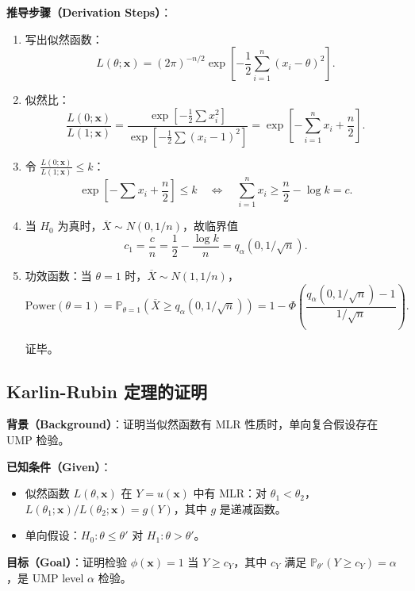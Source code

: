\textbf{推导步骤（Derivation Steps）}：

\begin{enumerate}
\item 写出似然函数：
\[
L(\theta; \mathbf{x}) = (2\pi)^{-n/2} \exp\left[-\frac{1}{2}\sum_{i=1}^n (x_i - \theta)^2\right].
\]

\item 似然比：
\[
\frac{L(0; \mathbf{x})}{L(1; \mathbf{x})} = \frac{\exp\left[-\frac{1}{2}\sum x_i^2\right]}{\exp\left[-\frac{1}{2}\sum (x_i-1)^2\right]} = \exp\left[-\sum_{i=1}^n x_i + \frac{n}{2}\right].
\]

\item 令 $\frac{L(0; \mathbf{x})}{L(1; \mathbf{x})} \leq k$：
\[
\exp\left[-\sum x_i + \frac{n}{2}\right] \leq k \quad \Longleftrightarrow \quad \sum_{i=1}^n x_i \geq \frac{n}{2} - \log k = c.
\]

\item 当 $H_0$ 为真时，$\overline{X} \sim N(0, 1/n)$，故临界值
\[
c_1 = \frac{c}{n} = \frac{1}{2} - \frac{\log k}{n} = q_{\alpha}(0, 1/\sqrt{n}).
\]

\item 功效函数：当 $\theta = 1$ 时，$\overline{X} \sim N(1, 1/n)$，
\[
\text{Power}(\theta=1) = \mathbb{P}_{\theta=1}\left(\overline{X} \geq q_{\alpha}(0, 1/\sqrt{n})\right) = 1 - \Phi\left(\frac{q_{\alpha}(0, 1/\sqrt{n}) - 1}{1/\sqrt{n}}\right).
\]

证毕。
\end{enumerate}

\subsection{Karlin-Rubin 定理的证明}\label{sec:karlin-rubin-proof}

\textbf{背景（Background）}：证明当似然函数有 MLR 性质时，单向复合假设存在 UMP 检验。

\textbf{已知条件（Given）}：
\begin{itemize}
\item 似然函数 $L(\theta, \mathbf{x})$ 在 $Y = u(\mathbf{x})$ 中有 MLR：对 $\theta_1 < \theta_2$，$L(\theta_1;\mathbf{x})/L(\theta_2;\mathbf{x}) = g(Y)$，其中 $g$ 是递减函数。
\item 单向假设：$H_0: \theta \leq \theta'$ 对 $H_1: \theta > \theta'$。
\end{itemize}

\textbf{目标（Goal）}：证明检验 $\phi(\mathbf{x}) = 1$ 当 $Y \geq c_Y$，其中 $c_Y$ 满足 $\mathbb{P}_{\theta'}(Y \geq c_Y) = \alpha$，是 UMP level $\alpha$ 检验。

